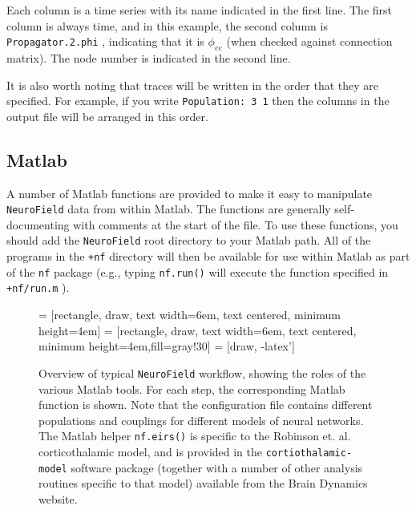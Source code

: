 \documentclass[12pt,a4paper]{article}
\newcommand{\type}[1]{{\small\small\tt #1} }
\newcommand{\NF}[0]{\type{NeuroField}}
\begin{document}
Each column is a time series with its name indicated in the first line. The first column is always time, and in this example, the second column is \type{Propagator.2.phi}, indicating that it is $\phi_{ee}$ (when checked against connection matrix). The node number is indicated in the second line.

It is also worth noting that traces will be written in the order that they are specified. For example, if you write \type{Population: 3 1} then the columns in the output file will be arranged in this order.

\subsection{Matlab}
A number of Matlab functions are provided to make it easy to manipulate \NF data from within Matlab. The functions are generally self-documenting with comments at the start of the file. To use these functions, you should add the \NF root directory to your Matlab path. All of the programs in the \type{+nf} directory will then be available for use within Matlab as part of the \type{nf} package (e.g., typing \type{nf.run()} will execute the function specified in \type{+nf/run.m}).

\begin{figure}[b]
\begin{center}
 = [rectangle, draw, text width=6em, text centered, minimum height=4em]
 = [rectangle, draw, text width=6em, text centered, minimum height=4em,fill=gray!30]
 = [draw, -latex']
\caption{Overview of typical \NF workflow, showing the roles of the various Matlab tools. For each step, the corresponding Matlab function is shown. Note that the configuration file contains different populations and couplings for different models of neural networks. The Matlab helper \type{nf.eirs()} is specific to the Robinson et. al. corticothalamic model, and is provided in the \type{cortiothalamic-model} software package (together with a number of other analysis routines specific to that model) available from the Brain Dynamics website.}
\label{fig:components}
\end{center}
\end{figure}
\end{document}
